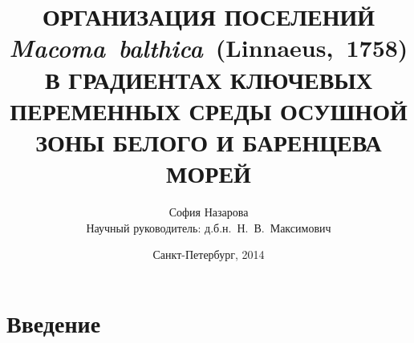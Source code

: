 \documentclass{beamer}
\begin{document}
\title[Поселения {\it M.~balthica} Белого и Баренцева морей]{ОРГАНИЗАЦИЯ ПОСЕЛЕНИЙ {\it Macoma~balthica}~(Linnaeus,~1758) В ГРАДИЕНТАХ КЛЮЧЕВЫХ ПЕРЕМЕННЫХ СРЕДЫ ОСУШНОЙ ЗОНЫ БЕЛОГО И БАРЕНЦЕВА МОРЕЙ}
\author[С.А.~Назарова]{София Назарова \\ \medskip
	\footnotesize{Научный руководитель: д.б.н.~Н.~В.~Максимович}}
\date{Санкт-Петербург, 2014} 
\frame{\titlepage} 






		\section{Введение}
\end{document}
